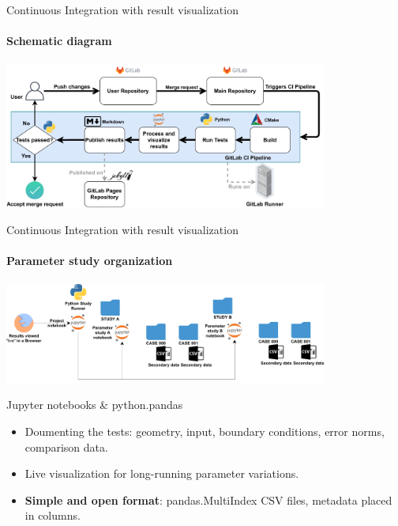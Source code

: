 \documentclass[
	ngerman,%
	aspectratio=169,%
	color={accentcolor=2d},
	logo=true,%
	colorframetitle=true,%
	]{tudabeamer}
\begin{document}
\begin{frame}{Continuous Integration with result visualization} 
	\framesubtitle{Schematic diagram}

	\centering
	\includegraphics[width=0.8\textwidth]{figures/ZINF-CI-diagram.pdf}

\end{frame}

\begin{frame}{Continuous Integration with result visualization} 
	\framesubtitle{Parameter study organization}
	
	\begin{center}
		\includegraphics[width=0.8\textwidth]{figures/Cluster-Parameter-Study-Organization.pdf}
	\end{center}

	Jupyter notebooks \& python.pandas
	\begin{itemize}
		\item Doumenting the tests: geometry, input, boundary conditions, error norms, comparison data.
		\item Live visualization for long-running parameter variations. 
		\item \textbf{Simple and open format}: pandas.MultiIndex CSV files, metadata placed in columns. 
	\end{itemize}

\end{frame}

	
\end{document}
